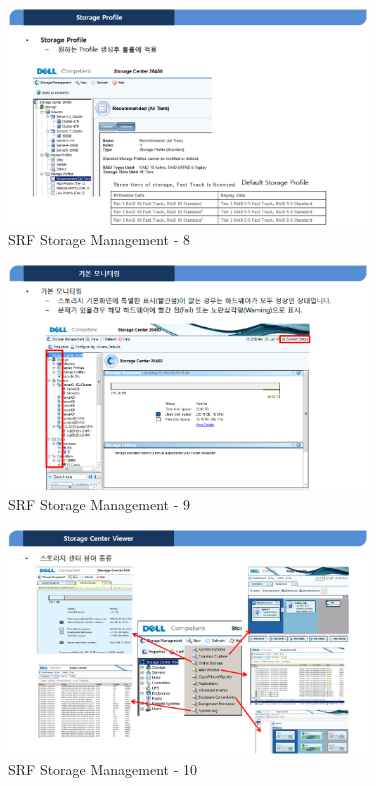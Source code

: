 \documentclass[11pt
  , a4paper
  , article
  , oneside
]{memoir}
\begin{document}
\begin{figure}[h!]
	\centering
	\includegraphics[width=0.85\textwidth]{./images/srfdb_storage_mana_8.eps}
	\caption{SRF Storage Management - 8}
	\label{fig:srfdb_mana_8} 
\end{figure}

\begin{figure}[h!]
	\centering
	\includegraphics[width=0.85\textwidth]{./images/srfdb_storage_mana_9.eps}
	\caption{SRF Storage Management - 9}
	\label{fig:srfdb_mana_9} 
\end{figure}

\begin{figure}[h!]
	\centering
	\includegraphics[width=0.85\textwidth]{./images/srfdb_storage_mana_10.eps}
	\caption{SRF Storage Management - 10}
	\label{fig:srfdb_mana_10} 
\end{figure}
\end{document}
